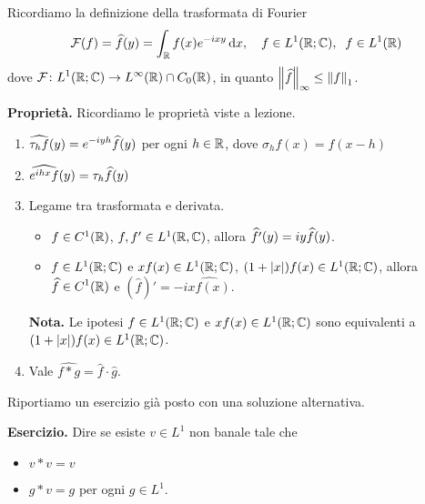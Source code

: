 
Ricordiamo la definizione della trasformata di Fourier
%
$$
	\mathcal{F}(f) = \widehat{f}(y) = \int_{\mathbb R} f(x) e^{-ixy} \,\mathrm{d} x, \quad f \in L^1(\mathbb R;\mathbb C), \;\; f \in L^1(\mathbb R)
$$
%
dove $\displaystyle \mathcal{F} \colon L^1(\mathbb R;\mathbb C) \to L^\infty(\mathbb R) \cap C_0(\mathbb R)$, in quanto $\left\lVert \widehat{f} \right\rVert_\infty \leq \left\lVert f \right\rVert_1$.


\textbf{Proprietà.} Ricordiamo le proprietà viste a lezione.

\begin{enumerate}
	\item $\displaystyle \widehat{\tau_h f}(y) = e^{-iyh} \widehat{f}(y)$ per ogni $h \in \mathbb R$, dove $\sigma_h f(x) = f(x - h)$


	\item $\displaystyle \widehat{e^{ihx} f}(y) = \tau_h \widehat{f}(y) $


	\item Legame tra trasformata e derivata.

	\begin{itemize}

		\item $f \in C^1(\mathbb R)$, $f,f' \in L^1(\mathbb R,\mathbb C)$, allora $\displaystyle \widehat{f'}(y) = iy \widehat{f}(y)$.


		\item $f \in L^1(\mathbb R;\mathbb C)$ e $xf(x) \in L^1(\mathbb R;\mathbb C)$, $(1 + |x|) f(x) \in L^1(\mathbb R;\mathbb C)$, allora $\displaystyle \widehat{f} \in C^1(\mathbb R)$ e $(\hat{f})' = -i \hat{xf(x)}$.

	\end{itemize}

	\textbf{Nota.} Le ipotesi $f \in L^1(\mathbb R;\mathbb C)$ e $xf(x) \in L^1(\mathbb R;\mathbb C)$ sono equivalenti a $(1 + |x|) f(x) \in L^1(\mathbb R;\mathbb C)$.


	\item  Vale $\hat{f \ast g} = \hat{f} \cdot \hat{g}$.
	
\end{enumerate}

Riportiamo un esercizio già posto con una soluzione alternativa. 

\textbf{Esercizio.} Dire se esiste $v \in L^1$ non banale tale che 
\begin{itemize}

	\item $v \ast v = v$

	\item $g \ast v = g$ per ogni $g \in L^1$.

\end{itemize}


